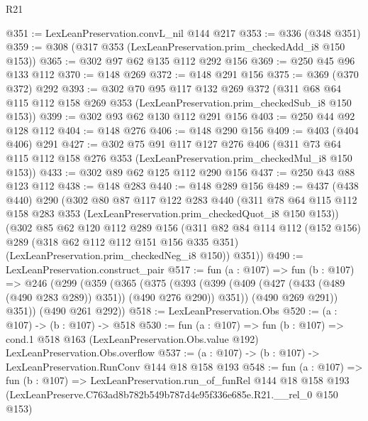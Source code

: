 \begin{lexlean}{R21}
\begin{coremodule}
@351 := LexLeanPreservation.convL_nil @144 @217
@353 := @336 (@348 @351)
@359 := @308 (@317 @353 (LexLeanPreservation.prim_checkedAdd_i8 @150 @153))
@365 := @302 @97 @62 @135 @112 @292 @156
@369 := @250 @45 @96 @133 @112
@370 := @148 @269
@372 := @148 @291 @156
@375 := @369 (@370 @372) @292
@393 := @302
    @70
    @95
    @117
    @132
    @269
    @372
    (@311 @68 @64 @115 @112 @158 @269 @353 (LexLeanPreservation.prim_checkedSub_i8 @150 @153))
@399 := @302 @93 @62 @130 @112 @291 @156
@403 := @250 @44 @92 @128 @112
@404 := @148 @276
@406 := @148 @290 @156
@409 := @403 (@404 @406) @291
@427 := @302
    @75
    @91
    @117
    @127
    @276
    @406
    (@311 @73 @64 @115 @112 @158 @276 @353 (LexLeanPreservation.prim_checkedMul_i8 @150 @153))
@433 := @302 @89 @62 @125 @112 @290 @156
@437 := @250 @43 @88 @123 @112
@438 := @148 @283
@440 := @148 @289 @156
@489 := @437
    (@438 @440)
    @290
    (@302
      @80
      @87
      @117
      @122
      @283
      @440
      (@311 @78 @64 @115 @112 @158 @283 @353 (LexLeanPreservation.prim_checkedQuot_i8 @150 @153))
      (@302
        @85
        @62
        @120
        @112
        @289
        @156
        (@311
          @82
          @84
          @114
          @112
          (@152 @156)
          @289
          (@318 @62 @112 @112 @151 @156 @335 @351)
          (LexLeanPreservation.prim_checkedNeg_i8 @150))
        @351))
@490 := LexLeanPreservation.construct_pair
@517 := fun (a : @107) =>
  fun (b : @107) =>
  @246
    (@299
      (@359
        (@365
          (@375
            (@393 (@399 (@409 (@427 (@433 (@489 (@490 @283 @289)) @351)) (@490 @276 @290)) @351))
            (@490 @269 @291))
          @351))
      (@490 @261 @292))
@518 := LexLeanPreservation.Obs
@520 := (a : @107) -> (b : @107) -> @518
@530 := fun (a : @107) =>
  fun (b : @107) =>
  cond.{1} @518 @163 (LexLeanPreservation.Obs.value @192) LexLeanPreservation.Obs.overflow
@537 := (a : @107) -> (b : @107) -> LexLeanPreservation.RunConv @144 @18 @158 @193
@548 := fun (a : @107) =>
  fun (b : @107) =>
  LexLeanPreservation.run_of_funRel
    @144
    @18
    @158
    @193
    (LexLeanPreserve.C763ad8b782b549b787d4e95f336e685e.R21.__rel_0 @150 @153)
\end{coremodule}
\end{lexlean}
